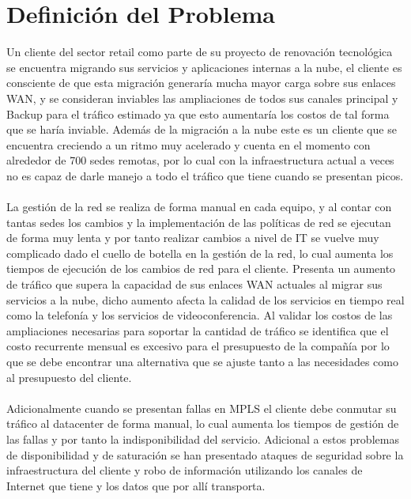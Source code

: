 

\section{Definición del Problema} %
\label{sec:Definición del Problema}

Un cliente del sector retail como parte de su proyecto de renovación tecnológica se encuentra migrando sus servicios y aplicaciones internas a la nube, el cliente es consciente de que esta migración generaría mucha mayor carga sobre sus enlaces WAN, y se consideran inviables las ampliaciones de todos sus canales principal y Backup para el tráfico estimado ya que esto aumentaría los costos de tal forma que se haría inviable. Además de la migración a la nube este es un cliente que se encuentra creciendo a un ritmo muy acelerado y cuenta en el momento con alrededor de 700 sedes remotas, por lo cual con la infraestructura actual a veces no es capaz de darle manejo a todo el tráfico que tiene cuando se presentan picos.
\\
\\
La gestión de la red se realiza de forma manual en cada equipo, y al contar con tantas sedes los cambios y la implementación de las políticas de red se ejecutan de forma muy lenta y por tanto realizar cambios a nivel de IT se vuelve muy complicado dado el cuello de botella en la gestión de la red, lo cual aumenta los tiempos de ejecución de los cambios de red para el cliente.
Presenta un aumento de tráfico que supera la capacidad de sus enlaces WAN actuales al migrar sus servicios a la nube, dicho aumento afecta la calidad de los servicios en tiempo real como la telefonía y los servicios de videoconferencia. Al validar los costos de las ampliaciones necesarias para soportar la cantidad de tráfico se identifica que el costo recurrente mensual es excesivo para el presupuesto de la compañía por lo que se debe encontrar una alternativa que se ajuste tanto a las necesidades como al presupuesto del cliente.
\\
\\
Adicionalmente cuando se presentan fallas en MPLS el cliente debe conmutar su tráfico al datacenter de forma manual, lo cual aumenta los tiempos de gestión de las fallas y por tanto la indisponibilidad del servicio. Adicional a estos problemas de disponibilidad y de saturación se han presentado ataques de seguridad sobre la infraestructura del cliente y robo de información utilizando los canales de Internet que tiene y los datos que por allí transporta.
